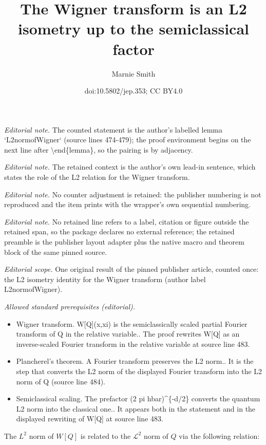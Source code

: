 \documentclass[10pt,a4paper]{article}
\title{The Wigner transform is an L2 isometry up to the semiclassical factor}
\author{Marnie Smith}
\date{doi:10.5802/jep.353; CC BY4.0}
\theoremstyle{plain}
\theoremstyle{remark}
\begin{document}
\maketitle
\noindent\textit{Editorial note.} The counted statement is the author's labelled lemma `L2normofWigner` (source lines 474-479); the proof environment begins on the next line after \textbackslash{}end\{lemma\}, so the pairing is by adjacency.\par\medskip
\noindent\textit{Editorial note.} The retained context is the author's own lead-in sentence, which states the role of the L2 relation for the Wigner transform.\par\medskip
\noindent\textit{Editorial note.} No counter adjustment is retained: the publisher numbering is not reproduced and the item prints with the wrapper's own sequential numbering.\par\medskip
\noindent\textit{Editorial note.} No retained line refers to a label, citation or figure outside the retained span, so the package declares no external reference; the retained preamble is the publisher layout adapter plus the native macro and theorem block of the same pinned source.\par\medskip
\noindent\textit{Editorial scope.} One original result of the pinned publisher article, counted once: the L2 isometry identity for the Wigner transform (author label L2normofWigner).\par\medskip
\noindent\textit{Allowed standard prerequisites (editorial).}\begin{itemize}
\item Wigner transform. W[Q](x,xi) is the semiclassically scaled partial Fourier transform of Q in the relative variable.. The proof rewrites W[Q] as an inverse-scaled Fourier transform in the relative variable at source line 483.
\item Plancherel's theorem. A Fourier transform preserves the L2 norm.. It is the step that converts the L2 norm of the displayed Fourier transform into the L2 norm of Q (source line 484).
\item Semiclassical scaling. The prefactor (2 pi hbar)\textasciicircum{}\{-d/2\} converts the quantum L2 norm into the classical one.. It appears both in the statement and in the displayed rewriting of W[Q] at source line 483.
\end{itemize}\medskip

The $L^2$ norm of $W[Q]$ is related to the $\mathcal L^2$ norm of $Q$ via the following relation:
\end{document}
